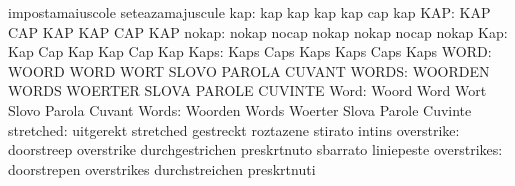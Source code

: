                                   impostamaiuscole                 seteazamajuscule
                             kap: kap                              kap
                                  kap                              kap
                                  cap                              kap
                             KAP: KAP                              CAP
                                  KAP                              KAP
                                  CAP                              KAP
                           nokap: nokap                            nocap
                                  nokap                            nokap
                                  nocap                            nokap
                             Kap: Kap                              Cap
                                  Kap                              Kap
                                  Cap                              Kap
                            Kaps: Kaps                             Caps
                                  Kaps                             Kaps
                                  Caps                             Kaps
                            WORD: WOORD                            WORD
                                  WORT                             SLOVO
                                  PAROLA                           CUVANT
                           WORDS: WOORDEN                          WORDS
                                  WOERTER                          SLOVA
                                  PAROLE                           CUVINTE
                            Word: Woord                            Word
                                  Wort                             Slovo
                                  Parola                           Cuvant
                           Words: Woorden                          Words
                                  Woerter                          Slova
                                  Parole                           Cuvinte
                       stretched: uitgerekt                        stretched
                                  gestreckt                        roztazene
                                  stirato                          intins
                      overstrike: doorstreep                       overstrike
                                  durchgestrichen                  preskrtnuto
                                  sbarrato                         liniepeste
                     overstrikes: doorstrepen                      overstrikes
                                  durchstreichen                   preskrtnuti
